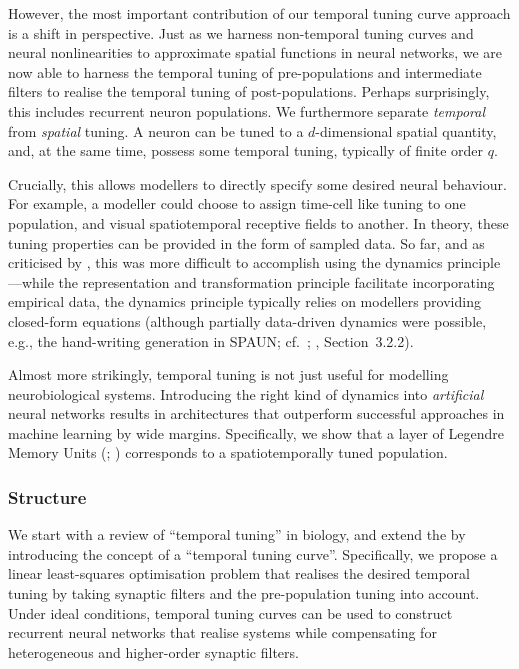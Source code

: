 However, the most important contribution of our temporal tuning curve approach is a shift in perspective.
Just as we harness non-temporal tuning curves and neural nonlinearities to approximate spatial functions in neural networks, we are now able to harness the temporal tuning of pre-populations and intermediate filters to realise the temporal tuning of post-populations.
Perhaps surprisingly, this includes recurrent neuron populations.
We furthermore separate \emph{temporal} from \emph{spatial} tuning.
A neuron can be tuned to a $d$-dimensional spatial quantity, and, at the same time, possess some temporal tuning, typically of finite order $q$.

Crucially, this allows modellers to directly specify some desired neural behaviour.
For example, a modeller could choose to assign time-cell like tuning \citep{pastalkova2008internally,tiganj2016sequential} to one population, and visual spatiotemporal receptive fields \citep{carandini1999linearity} to another.
In theory, these tuning properties can be provided in the form of sampled data.
So far, and as criticised by \citet{nicola2017supervised}, this was more difficult to accomplish using the \NEF dynamics principle---while the representation and transformation principle facilitate incorporating empirical data, the dynamics principle typically relies on modellers providing closed-form equations (although partially data-driven dynamics were possible, e.g., the hand-writing generation in SPAUN; cf.~\cite{eliasmith2012largescale}; \cite{choo2018spaun}, Section~3.2.2).

Almost more strikingly, temporal tuning is not just useful for modelling neurobiological systems.
Introducing the right kind of dynamics into \emph{artificial} neural networks results in architectures that outperform successful approaches in machine learning by wide margins.
Specifically, we show that a layer of Legendre Memory Units (\LMUpl; \cite{voelker2019lmu}) corresponds to a spatiotemporally tuned \NEF population.

\subsubsection{Structure}
We start  with a review of \enquote{temporal tuning} in biology, and extend the \NEF by introducing the concept of a \enquote{temporal tuning curve}.
Specifically, we propose a linear least-squares optimisation problem that realises the desired temporal tuning by taking synaptic filters and the pre-population tuning into account.
Under ideal conditions, temporal tuning curves can be used to construct recurrent neural networks that realise \LTI systems while compensating for heterogeneous and higher-order synaptic filters.

